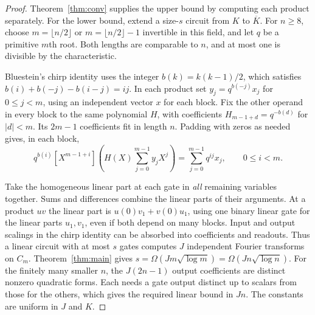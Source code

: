 \begin{proof}
Theorem~\ref{thm:conv} supplies the upper bound by computing each
product separately. For the lower bound, extend a size-\(s\) circuit
from \(K\) to \(\overline K\). For \(n\ge8\), choose
\(m=\lfloor n/2\rfloor\) or \(m=\lfloor n/2\rfloor-1\) invertible in
this field, and let \(q\) be a primitive \(m\)th root. Both lengths
are comparable to \(n\), and at most one is divisible by the
characteristic.

Bluestein's chirp identity \cite{Bluestein} uses the integer
\(b(k)=k(k-1)/2\), which satisfies \(b(i)+b(-j)-b(i-j)=ij\).
In each product set \(y_j=q^{b(-j)}x_j\) for \(0\le j<m\), using an
independent vector \(x\) for each block. Fix the other operand in every
block to the same polynomial \(H\), with coefficients
\(H_{m-1+d}=q^{-b(d)}\) for \(|d|<m\). Its \(2m-1\) coefficients fit
in length \(n\). Padding with zeros as needed gives, in each block,
\[
  q^{b(i)}[X^{m-1+i}]\left(H(X)\sum_{j=0}^{m-1} y_j X^j\right)
       =\sum_{j=0}^{m-1} q^{ij}x_j,\qquad 0\le i<m .
\]

Take the homogeneous linear part at each gate in \emph{all} remaining
variables together. Sums and differences combine the linear parts of
their arguments. At a product \(uv\) the linear part is
\(u(0)v_1+v(0)u_1\), using one binary linear gate for the linear
parts \(u_1,v_1\), even if both depend on many blocks. Input and output
scalings in the chirp identity can be absorbed into coefficients and
readouts. Thus a linear circuit with at most \(s\) gates computes
\(J\) independent Fourier transforms on \(C_m\). Theorem~\ref{thm:main}
gives \(s=\Omega(Jm\sqrt{\log m})=\Omega(Jn\sqrt{\log n})\).
For the finitely many smaller \(n\), the \(J(2n-1)\) output
coefficients are distinct nonzero quadratic forms. Each needs a gate
output distinct up to scalars from those for the others, which gives
the required linear bound in \(Jn\). The constants are uniform in
\(J\) and \(K\).
\end{proof}
